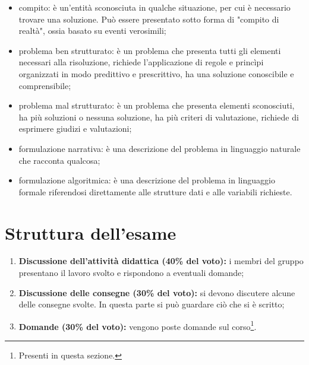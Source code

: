 \begin{itemize}
    \item compito: è un'entità sconosciuta in qualche situazione, per cui è necessario trovare una soluzione.
    Può essere presentato sotto forma di "compito di realtà", ossia basato su 
    eventi verosimili;  
    \item problema ben strutturato: è un problema che presenta tutti gli elementi necessari
    alla risoluzione, richiede l'applicazione di regole e princìpi organizzati in modo 
    predittivo e prescrittivo, ha una soluzione conoscibile e comprensibile;
    \item problema mal strutturato: è un problema che presenta elementi sconosciuti,
    ha più soluzioni o nessuna soluzione, ha più criteri di valutazione, richiede di esprimere
    giudizi e valutazioni;
    \item formulazione narrativa: è una descrizione del problema in linguaggio naturale
    che racconta qualcosa;
    \item formulazione algoritmica: è una descrizione del problema in linguaggio formale
    riferendosi direttamente alle strutture dati e alle variabili richieste.
\end{itemize}



\section{Struttura dell'esame}

\begin{enumerate}
    \item \textbf{Discussione dell'attività didattica (40\% del voto):} i membri del gruppo
    presentano il lavoro svolto e rispondono a eventuali domande;
    \item \textbf{Discussione delle consegne (30\% del voto):} si devono discutere alcune delle consegne svolte.
    In questa parte si può guardare ciò che si è scritto;
    \item \textbf{Domande (30\% del voto):} vengono poste domande sul corso\footnote{Presenti in questa sezione.}. 
\end{enumerate}

